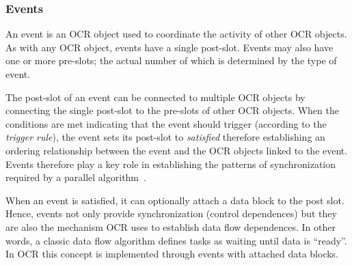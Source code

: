 \subsubsection{Events}
\label{sec:Event}

An event is an OCR object used to coordinate the activity of other OCR
objects. As with any OCR object, events have a single
post-slot. Events may also have one or more pre-slots; the actual
number of which is determined by the type of event.

The post-slot of an event can be connected to multiple OCR objects by
connecting the single post-slot to the pre-slots of other OCR objects.
When the conditions are met indicating that the event should trigger
(according to the \emph{trigger rule}), the event
sets its post-slot to \emph{satisfied} therefore establishing an
ordering relationship between the event and the OCR objects linked to
the event. Events therefore play a key role in establishing the
patterns of synchronization required by a parallel
algorithm~\cite{ImSa14-2}.

When an event is satisfied, it can optionally attach a data block to
the post slot. Hence, events not only provide synchronization
(control dependences) but they are also the mechanism OCR uses to
establish data flow dependences. In other words, a classic data flow
algorithm defines tasks as waiting until data is ``ready''. In OCR
this concept is implemented through events with attached data blocks.

